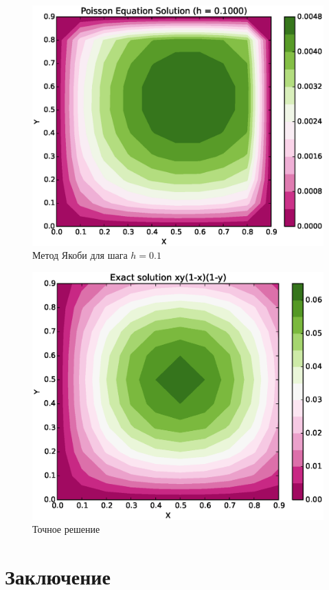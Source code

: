 \documentclass[12pt,a4paper]{article}
\begin{document}
\begin{figure}
	\centering
	\includegraphics{1_u.eps}
	\caption{Метод Якоби для шага $h=0.1$}\label{fig:u0.1}
\end{figure}

\begin{figure}
	\centering
	\includegraphics{1_exact.eps}
	\caption{Точное решение}\label{fig:e0.1}
\end{figure}


\section{Заключение}
\label{sec:summary}
\end{document}
